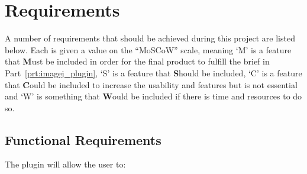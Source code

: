 
\onecolumn
\section{Requirements}
\label{sec:requirements}

A number of requirements that should be achieved during this project are listed
below. Each is given a value on the ``MoSCoW'' scale, meaning `M' is a feature
that \textbf{M}ust be included in order for the final product to fulfill the
brief in Part~\ref{prt:imagej_plugin}, `S' is a feature that \textbf{S}hould
be included, `C' is a feature that \textbf{C}ould be included to increase the
usability and features but is not essential and `W' is something that
\textbf{W}ould be included if there is time and resources to do so.

\subsection{Functional Requirements}
\label{sub:functional_requirements}

The plugin will allow the user to:

